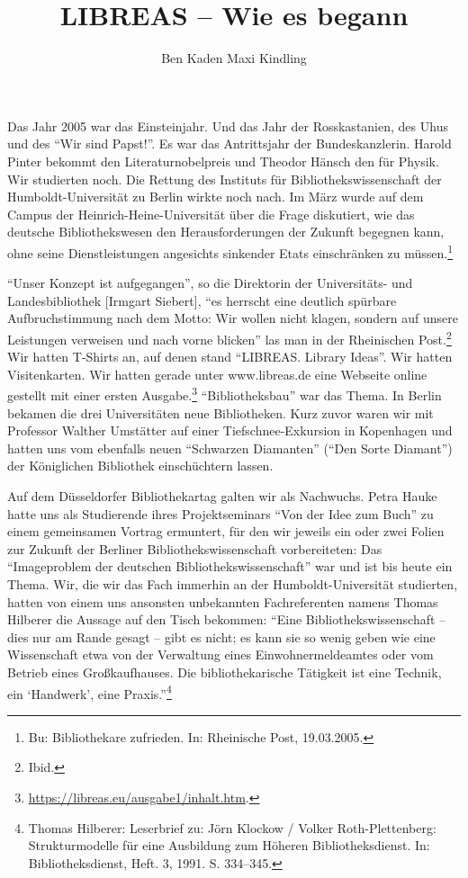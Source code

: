 \documentclass[output=paper]{langsci/langscibook}
\title{LIBREAS -- Wie es begann}
\author{Ben Kaden \lastand Maxi Kindling}
\begin{document}
\maketitle

\noindent Das Jahr 2005 war das Einsteinjahr. Und das Jahr der Rosskastanien, des
Uhus und des \enquote{Wir sind Papst!}. Es war das Antrittsjahr der
Bundeskanzlerin. Harold Pinter bekommt den Literaturnobelpreis und
Theodor Hänsch den für Physik. Wir studierten noch. Die Rettung des
Instituts für Bibliothekswissenschaft der Humboldt-Universität zu Berlin
wirkte noch nach. Im März wurde auf dem Campus der
Heinrich-Heine-Universität über die Frage diskutiert, wie das deutsche
Bibliothekswesen den Herausforderungen der Zukunft begegnen kann, ohne
seine Dienstleistungen angesichts sinkender Etats einschränken zu
müssen.\footnote{Bu: Bibliothekare zufrieden. In: Rheinische Post,
  19.03.2005.}

\enquote{Unser Konzept ist aufgegangen}, so die Direktorin der
Universitäts- und Landesbibliothek {[}Irmgart Siebert{]}, \enquote{es
herrscht eine deutlich spürbare Aufbruchstimmung nach dem Motto: Wir
wollen nicht klagen, sondern auf unsere Leistungen verweisen und nach
vorne blicken} las man in der Rheinischen Post.\footnote{Ibid.} Wir
hatten T-Shirts an, auf denen stand \enquote{LIBREAS. Library Ideas}.
Wir hatten Visitenkarten. Wir hatten gerade unter www.libreas.de eine
Webseite online gestellt mit einer ersten Ausgabe.\footnote{\url{https://libreas.eu/ausgabe1/inhalt.htm}.}
\enquote{Bibliotheksbau} war das Thema. In Berlin bekamen die drei
Universitäten neue Bibliotheken. Kurz zuvor waren wir mit Professor
Walther Umstätter auf einer Tiefschnee-Exkursion in Kopenhagen und
hatten uns vom ebenfalls neuen \enquote{Schwarzen Diamanten}
(\enquote{Den Sorte Diamant}) der Königlichen Bibliothek einschüchtern
lassen.

Auf dem Düsseldorfer Bibliothekartag galten wir als Nachwuchs. Petra
Hauke hatte uns als Studierende ihres Projektseminars \enquote{Von der
Idee zum Buch} zu einem gemeinsamen Vortrag ermuntert, für den wir
jeweils ein oder zwei Folien zur Zukunft der Berliner
Bibliothekswissenschaft vorbereiteten: Das \enquote{Imageproblem der
deutschen Bibliothekswissenschaft} war und ist bis heute ein Thema. Wir,
die wir das Fach immerhin an der Humboldt-Universität studierten, hatten
von einem uns ansonsten unbekannten Fachreferenten namens Thomas
Hilberer die Aussage auf den Tisch bekommen: \enquote{Eine
Bibliothekswissenschaft -- dies nur am Rande gesagt -- gibt es nicht; es
kann sie so wenig geben wie eine Wissenschaft etwa von der Verwaltung
eines Einwohnermeldeamtes oder vom Betrieb eines Großkaufhauses. Die
bibliothekarische Tätigkeit ist eine Technik, ein \enquote*{Handwerk},
eine Praxis.}\footnote{Thomas Hilberer: Leserbrief zu: Jörn Klockow /
  Volker Roth-Plettenberg: Strukturmodelle für eine Ausbildung zum
  Höheren Bibliotheksdienst. In: Bibliotheksdienst, Heft. 3, 1991. S.
  334--345.}
\end{document}
